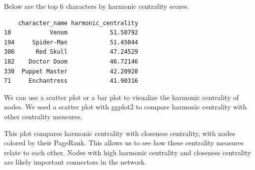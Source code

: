 \documentclass[
  letterpaper,
  DIV=11,
  numbers=noendperiod]{scrartcl}
\newenvironment{Shaded}{\begin{snugshade}}{\end{snugshade}}
\newcommand{\AttributeTok}[1]{\textcolor[rgb]{0.40,0.45,0.13}{#1}}
\newcommand{\CommentTok}[1]{\textcolor[rgb]{0.37,0.37,0.37}{#1}}
\newcommand{\DecValTok}[1]{\textcolor[rgb]{0.68,0.00,0.00}{#1}}
\newcommand{\FunctionTok}[1]{\textcolor[rgb]{0.28,0.35,0.67}{#1}}
\newcommand{\NormalTok}[1]{\textcolor[rgb]{0.00,0.23,0.31}{#1}}
\newcommand{\OtherTok}[1]{\textcolor[rgb]{0.00,0.23,0.31}{#1}}
\newcommand{\SpecialCharTok}[1]{\textcolor[rgb]{0.37,0.37,0.37}{#1}}
\begin{document}
Below are the top 6 characters by harmonic centrality scores.

\begin{Shaded}
\end{Shaded}

\begin{verbatim}
    character_name harmonic_centrality
10           Venom            51.50792
194     Spider-Man            51.45044
306      Red Skull            47.24529
182    Doctor Doom            46.72146
330  Puppet Master            42.20920
71     Enchantress            41.90316
\end{verbatim}

We can use a scatter plot or a bar plot to visualize the harmonic
centrality of nodes. We used a scatter plot with ggplot2 to compare
harmonic centrality with other centrality measures.

This plot compares harmonic centrality with closeness centrality, with
nodes colored by their PageRank. This allows us to see how these
centrality measures relate to each other. Nodes with high harmonic
centrality and closeness centrality are likely important connectors in
the network.
\end{document}
